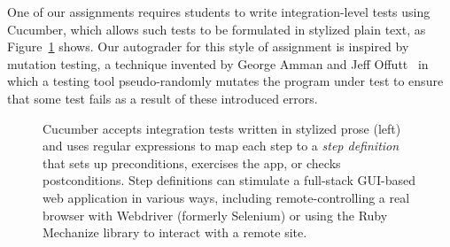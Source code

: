 One of our assignments requires students to write integration-level
tests using Cucumber, which allows such tests to be formulated in
stylized plain text, as Figure~\ref{fig:cucumber} shows.
Our autograder for this
style of assignment is inspired by mutation testing, a technique invented
by George Amman and Jeff 
Offutt~\cite{ammann-offutt-sw-testing} in which a
testing tool pseudo-randomly mutates the program under test to ensure
that some test fails as a result of these introduced errors.



\begin{figure}
  \begin{minipage}{0.45\textwidth}%
  \end{minipage}%
  \begin{minipage}{0.5\textwidth}%
  \end{minipage}%
  \caption{\label{fig:cucumber} Cucumber accepts integration tests 
    written in stylized prose (left) and uses regular expressions to map each
    step to a \emph{step definition} that sets up preconditions, exercises the app,
    or checks postconditions.  Step definitions 
    can stimulate a full-stack GUI-based web application in various
    ways, including remote-controlling a real browser with Webdriver
    (formerly Selenium) or using the Ruby Mechanize library to interact
    with a remote site.}
\end{figure}



